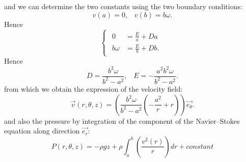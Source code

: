 \documentclass[DIV=12]{article}
\newcommand{\etheta}{\vec{e_\theta}}
\newcommand{\er}{\vec{e_r}}
\begin{document}
 and we can determine the two constants using the two boundary conditions:
\begin{equation}
 v( a ) = 0,\;\;\; v( b ) = b\omega.
\end{equation}
 Hence
\begin{equation}
 \begin{cases}
  \begin{array}{ll}  
  0 & = \frac{E}{a} + Da \\
  b\omega & = \frac{E}{b} + Db.
 \end{array}
\end{cases} 
 \end{equation}
Hence
 \begin{equation}
 D = \frac{b^2\omega}{b^2 - a^2},\;\;\; E = -\frac{a^2b^2\omega}{ b^2 - a^2}.
 \end{equation}
 from which we obtain the expression of the velocity field:
\begin{equation}
\boxed{
\vec{v}(r,\theta,z) = \left( \frac{b^2\omega}{ b^2 - a^2}\left( -\frac{a^2}{r} + r \right) \right) \etheta.}
\end{equation}
 and also the pressure by integration of the component of the Navier--Stokes equation along direction $\er$:
\begin{equation}
P(r,\theta,z) = -\rho g z + \rho\int_a^b\left( \frac{v^2(r)}{r}\right)dr + constant
\end{equation}
\end{document}
